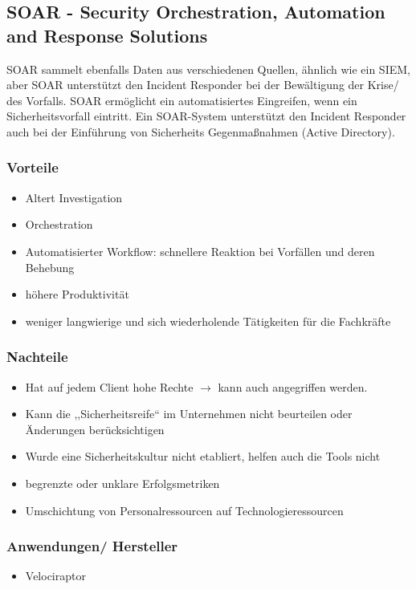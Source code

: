 \subsection{SOAR - Security Orchestration, Automation and Response Solutions}
SOAR sammelt ebenfalls Daten aus verschiedenen Quellen, ähnlich wie ein SIEM, aber SOAR unterstützt den Incident Responder bei der Bewältigung der Krise/ des Vorfalls.
SOAR ermöglicht ein automatisiertes Eingreifen, wenn ein Sicherheitsvorfall eintritt. Ein SOAR-System unterstützt den Incident Responder auch bei der Einführung von Sicherheits Gegenmaßnahmen (Active Directory).

\subsubsection{Vorteile}
\begin{itemize}
    \item Altert Investigation
    \item Orchestration
    \item Automatisierter Workflow: schnellere Reaktion bei Vorfällen und deren Behebung
    \item höhere Produktivität
    \item weniger langwierige und sich wiederholende Tätigkeiten für die Fachkräfte
\end{itemize}

\subsubsection{Nachteile}
\begin{itemize}
    \item Hat auf jedem Client hohe Rechte $\rightarrow$ kann auch angegriffen werden.
    \item Kann die ,,Sicherheitsreife`` im Unternehmen nicht beurteilen oder Änderungen berücksichtigen
    \item Wurde eine Sicherheitskultur nicht etabliert, helfen auch die Tools nicht
    \item begrenzte oder unklare Erfolgsmetriken
    \item Umschichtung von Personalressourcen auf Technologieressourcen
\end{itemize}

\subsubsection{Anwendungen/ Hersteller}
\begin{itemize}
    \item Velociraptor
\end{itemize}

